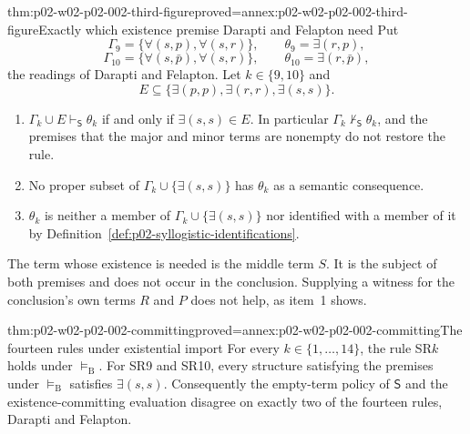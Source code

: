 \begin{hbtheorem}{thm:p02-w02-p02-002-third-figure}{proved=annex:p02-w02-p02-002-third-figure}{Exactly which existence premise Darapti and Felapton need}
Put
\[
 \Gamma_9=\{\forall(s,p),\forall(s,r)\},\qquad \theta_9=\exists(r,p),
\]
\[
 \Gamma_{10}=\{\forall(s,\bar p),\forall(s,r)\},\qquad
 \theta_{10}=\exists(r,\bar p),
\]
the readings of Darapti and Felapton. Let \(k\in\{9,10\}\) and
\[
 E\subseteq\{\exists(p,p),\exists(r,r),\exists(s,s)\}.
\]
\begin{enumerate}
\item \(\Gamma_k\cup E\vdash_{\mathsf S}\theta_k\) if and only if
 \(\exists(s,s)\in E\). In particular
 \(\Gamma_k\nvdash_{\mathsf S}\theta_k\), and the premises that the major
 and minor terms are nonempty do not restore the rule.
\item No proper subset of \(\Gamma_k\cup\{\exists(s,s)\}\) has
 \(\theta_k\) as a semantic consequence.
\item \(\theta_k\) is neither a member of \(\Gamma_k\cup\{\exists(s,s)\}\)
 nor identified with a member of it by
 Definition~\ref{def:p02-syllogistic-identifications}.
\end{enumerate}
\end{hbtheorem}

The term whose existence is needed is the middle term \(S\). It is the
subject of both premises and does not occur in the conclusion. Supplying a
witness for the conclusion's own terms \(R\) and \(P\) does not help, as
item~1 shows.

\begin{hbtheorem}{thm:p02-w02-p02-002-committing}{proved=annex:p02-w02-p02-002-committing}{The fourteen rules under existential import}
For every \(k\in\{1,\ldots,14\}\), the rule SR\(k\) holds under
\(\models_{\mathrm B}\). For SR9 and SR10, every structure satisfying the
premises under \(\models_{\mathrm B}\) satisfies \(\exists(s,s)\).
Consequently the empty-term policy of \(\mathsf S\) and the
existence-committing evaluation disagree on exactly two of the fourteen
rules, Darapti and Felapton.
\end{hbtheorem}

